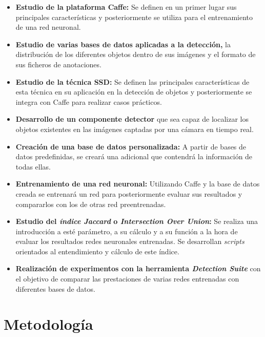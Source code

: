 \documentclass[a4paper, 12pt, oneside]{book}
\begin{document}
\begin{itemize}
\item \textbf{Estudio de la plataforma Caffe:} Se definen en un primer lugar sus principales características y posteriormente se utiliza para el entrenamiento de una red neuronal.
\item \textbf{Estudio de varias bases de datos aplicadas a la detección,} la distribución de los diferentes objetos dentro de sus imágenes y el formato de sus ficheros de anotaciones.
\item \textbf{Estudio de la técnica SSD: } Se definen las principales características de esta técnica en su aplicación en la detección de objetos y posteriormente se integra con Caffe para realizar casos prácticos.
\item \textbf{Desarrollo de un componente detector} que sea capaz de localizar los objetos existentes en las imágenes captadas por una cámara en tiempo real.
\item \textbf{Creación de una base de datos personalizada:} A partir de bases de datos predefinidas, se creará una adicional que contendrá la información de todas ellas.
\item \textbf{Entrenamiento de una red neuronal:} Utilizando Caffe y la base de datos creada se entrenará un red para posteriormente evaluar sus resultados y compararlos con los de otras red preentrenadas.
\begin{comment}
\item \textbf{Desarrollo de \textit{scripts} para el cáculo \textit{índice Jaccard} o \textit{Intersection Over Union}} utilizando un mismo conjunto de imágenes de prueba sobre una misma red neuronal entrenada con diferentes bases de datos. De esta manera se podrán comparar las prestaciones de cada uno de las redes entrenadas.
\end{comment}
\item \textbf{Estudio del \textit{índice Jaccard} o \textit{Intersection Over Union}:} Se realiza una introducción a esté parámetro, a su cálculo y a su función a la hora de evaluar los resultados redes neuronales entrenadas. Se desarrollan \textit{scripts} orientados al entendimiento y cálculo de este índice.
\item \textbf{Realización de experimentos con la herramienta \textit{Detection Suite}} con el objetivo de comparar las prestaciones de varias redes entrenadas con diferentes bases de datos.
\end{itemize}

\section{Metodología}
\end{document}
